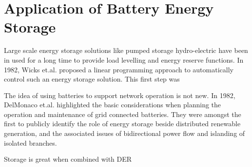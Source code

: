 \section{Application of Battery Energy Storage}
\label{ch-review:sec:application-of-battery-energy-storage}



Large scale energy storage solutions like pumped storage hydro-electric have been in used for a long time to provide load levelling and energy reserve functions. In 1982, Wicks et.al. \cite{Wicks1982} proposed a linear programming approach to automatically control such an energy storage solution. This first step was 

The idea of using batteries to support network operation is not new. In 1982, DelMonaco et.al.\cite{DelMonaco1982} highlighted the basic considerations when planning the operation and maintenance of grid connected batteries. They were amongst the first to publicly identify the role of energy storage beside distributed renewable generation, and the associated issues of bidirectional power flow and islanding of isolated branches. 

Storage is great when combined with DER
\cite{Papathanassiou2006}


